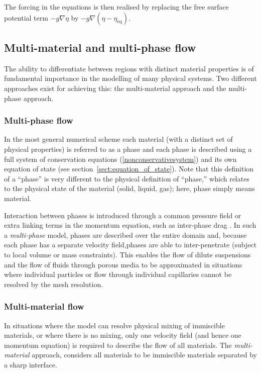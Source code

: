 The forcing in the equations is then realised by replacing the free surface
potential term $-g\nabla\eta$ by $-g\nabla(\eta-\eta_{\mathrm{eq}})$.



\subsection{Multi-material and multi-phase flow}
The ability to differentiate between regions with distinct material properties is of fundamental importance in the modelling of many physical systems.  Two different approaches exist for achieving this: the multi-material approach and the multi-phase approach.  

\subsubsection{Multi-phase flow}
In the most general numerical scheme each material (with a distinct set of physical properties) is referred to as a phase and each phase is described using a full system of conservation equations (\eg \eqref{nonconservativesystem}) and its own equation of state (see section~\ref{sect:equation_of_state}).  Note that this definition of a ``phase'' is very different to the physical definition of ``phase,'' which relates to the physical state of the material (\eg solid, liquid, gas); here, phase simply means material.

Interaction between phases is introduced through a common pressure field or extra linking terms in the momentum equation, such as inter-phase drag \citep{neri:2003, brennen:2005}.  In such a \emph{multi-phase} model, phases are described over the entire domain and, because each phase has a separate velocity field,phases are able to inter-penetrate (subject to local volume or mass constraints).  This enables the flow of dilute suspensions and the flow of fluids through porous media to be approximated in situations where individual particles or flow through individual capillaries cannot be resolved by the mesh resolution.  

\subsubsection{Multi-material flow}
In situations where the model can resolve physical mixing of immiscible materials, or where there is no mixing, only one velocity field (and hence one momentum equation) is required to describe the flow of all materials. The \emph{multi-material} approach, considers all materials to be immiscible materials separated by a sharp interface.

